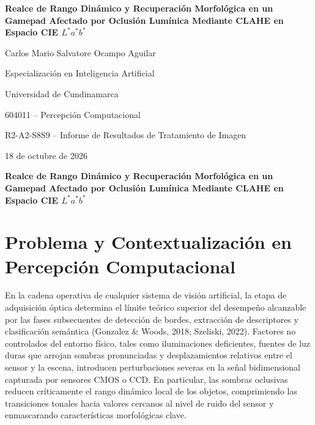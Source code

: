 \documentclass[12pt,letterpaper]{article}
\begin{document}
\raggedright

\begin{titlepage}\thispagestyle{fancy}
\begin{center}
\vspace*{1in}
{\bfseries Realce de Rango Din\'amico y Recuperaci\'on Morfol\'ogica en un Gamepad Afectado por Oclusi\'on Lum\'inica Mediante CLAHE en Espacio CIE $L^*a^*b^*$\par}
\vspace{1.5\baselineskip}
Carlos Mario Salvatore Ocampo Aguilar\par
Especializaci\'on en Inteligencia Artificial\par
Universidad de Cundinamarca\par
604011 -- Percepci\'on Computacional\par
R2-A2-S8S9 -- Informe de Resultados de Tratamiento de Imagen\par
18 de octubre de 2026\par
\end{center}
\vfill
\end{titlepage}
\setcounter{page}{2}

\begin{center}
\textbf{Realce de Rango Din\'amico y Recuperaci\'on Morfol\'ogica en un Gamepad Afectado por Oclusi\'on Lum\'inica Mediante CLAHE en Espacio CIE $L^*a^*b^*$}
\end{center}

\section{Problema y Contextualizaci\'on en Percepci\'on Computacional}
En la cadena operativa de cualquier sistema de visi\'on artificial, la etapa de adquisici\'on \'optica determina el l\'imite te\'orico superior del desempe\~no alcanzable por las fases subsecuentes de detecci\'on de bordes, extracci\'on de descriptores y clasificaci\'on sem\'antica (Gonzalez \& Woods, 2018; Szeliski, 2022). Factores no controlados del entorno f\'isico, tales como iluminaciones deficientes, fuentes de luz duras que arrojan sombras pronunciadas y desplazamientos relativos entre el sensor y la escena, introducen perturbaciones severas en la se\~nal bidimensional capturada por sensores CMOS o CCD. En particular, las sombras oclusivas reducen cr\'iticamente el rango din\'amico local de los objetos, comprimiendo las transiciones tonales hacia valores cercanos al nivel de ruido del sensor y enmascarando caracter\'isticas morfol\'ogicas clave.
\end{document}
